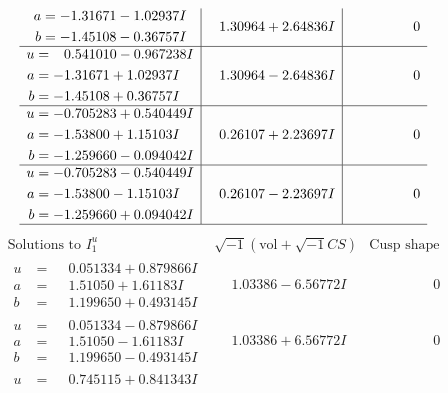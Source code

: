 \documentclass[1p]{elsarticle_modified}
\theoremstyle{definition}
\newcommand{\I}{\sqrt{-1}}
\begin{document}
$$\begin{array}{c|c|c}
\begin{aligned}
a &= -1.31671 - 1.02937 I \\
b &= -1.45108 - 0.36757 I\end{aligned}
 & \phantom{-}1.30964 + 2.64836 I & \phantom{-0.000000 } 0 \\ \hline\begin{aligned}
u &= \phantom{-}0.541010 - 0.967238 I \\
a &= -1.31671 + 1.02937 I \\
b &= -1.45108 + 0.36757 I\end{aligned}
 & \phantom{-}1.30964 - 2.64836 I & \phantom{-0.000000 } 0 \\ \hline\begin{aligned}
u &= -0.705283 + 0.540449 I \\
a &= -1.53800 + 1.15103 I \\
b &= -1.259660 - 0.094042 I\end{aligned}
 & \phantom{-}0.26107 + 2.23697 I & \phantom{-0.000000 } 0 \\ \hline\begin{aligned}
u &= -0.705283 - 0.540449 I \\
a &= -1.53800 - 1.15103 I \\
b &= -1.259660 + 0.094042 I\end{aligned}
 & \phantom{-}0.26107 - 2.23697 I & \phantom{-0.000000 } 0\\
 \hline 
 \end{array}$$\newpage$$\begin{array}{c|c|c}  
\text{Solutions to }I^u_{1}& \I (\text{vol} + \sqrt{-1}CS) & \text{Cusp shape}\\
 \hline 
\begin{aligned}
u &= \phantom{-}0.051334 + 0.879866 I \\
a &= \phantom{-}1.51050 + 1.61183 I \\
b &= \phantom{-}1.199650 + 0.493145 I\end{aligned}
 & \phantom{-}1.03386 - 6.56772 I & \phantom{-0.000000 } 0 \\ \hline\begin{aligned}
u &= \phantom{-}0.051334 - 0.879866 I \\
a &= \phantom{-}1.51050 - 1.61183 I \\
b &= \phantom{-}1.199650 - 0.493145 I\end{aligned}
 & \phantom{-}1.03386 + 6.56772 I & \phantom{-0.000000 } 0 \\ \hline\begin{aligned}
u &= \phantom{-}0.745115 + 0.841343 I \\

\end{aligned}
\end{array}$$
\end{document}
